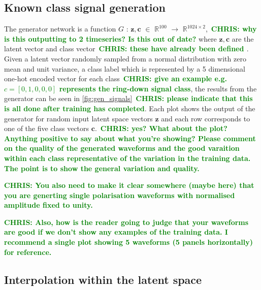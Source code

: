 \documentclass[12pt]{iopart}
\newcommand{\chris}[1]{\textbf{\textcolor{green}{CHRIS: #1}}}
\begin{document}
\subsection{Known class signal generation}

The generator network is a function $G$ : $\mathbf{z},\mathbf{c} $ $\in$
$\mathbb{R}^{100}$ $\to$ $\mathbb{R}^{1024\times2}$,~\chris{why is this
outputting to 2 timeseries? Is this out of date?} where $\mathbf{z},\mathbf{c}$
are the latent vector and class vector~\chris{these have already been defined
}. Given a latent vector randomly sampled from a normal distribution with zero
mean and unit variance, a class label which is represented by a 5 dimensional
one-hot encoded vector for each class~\chris{give an example e.g.
$c=[0,1,0,0,0]$ represents the ring-down signal class}, the results from the
generator can be seen in \cref{fig:gen_signals}~\chris{please indicate that
this is all done after training has completed}. Each plot shows the output of
the generator for random input latent space vectors $\mathbf{z}$ and each row
corresponds to one of the five class vectors $\mathbf{c}$.~\chris{yes? What
about the plot? Anything positive to say about what you're showing? Please
comment on the quality of the generated waveforms and the good varaition within
each class representative of the variation in the training data. The point is
to show the general variation and quality.}

\chris{You also need to make it clear somewhere (maybe here) that you are
generting single polarisation waveforms with normalised amplitude fixed to
unity.}

\chris{Also, how is the reader going to judge that your waveforms are good if
we don't show any examples of the training data. I recommend a single plot
showing 5 waveforms (5 panels horizontally) for reference.}

\subsection{Interpolation within the latent space}
\end{document}

